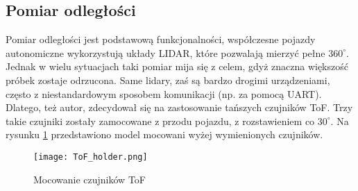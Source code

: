 
    \subsection{Pomiar odległości}
        Pomiar odległości jest podstawową funkcjonalności, współczesne pojazdy autonomiczne wykorzystują układy LIDAR, które pozwalają mierzyć pełne $360^\circ$.
        Jednak w wielu sytuacjach taki pomiar mija się z celem, gdyż znaczna większość próbek zostaje odrzucona.
        Same lidary, zaś są bardzo drogimi urządzeniami, często z niestandardowym sposobem komunikacji (np. za pomocą UART).
        Dlatego, też autor, zdecydował się na zastosowanie tańszych czujników ToF.
        Trzy takie czujniki zostały zamocowane z przodu pojazdu, z rozstawieniem co $30^\circ$.
        Na rysunku \ref{fig:ToF_holder} przedstawiono model mocowani wyżej wymienionych czujników.
        \begin{figure}[!ht]
            \centering
            \texttt{[image: ToF\_holder.png]}
            \caption{Mocowanie czujników ToF}
            \label{fig:ToF_holder}
        \end{figure}
